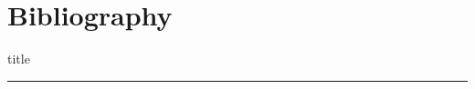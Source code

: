 \documentclass{beamer}
\begin{document}
\section{Bibliography}
    \begin{frame}[plain]
        \vfill
      \centering
      \begin{beamercolorbox}[sep=8pt,center,shadow=true,rounded=true]{title}
        \insertsectionhead\par%
        \color{oxfordblue}\noindent\rule{10cm}{1pt} \\
      \end{beamercolorbox}
      \vfill
  \end{frame}

\subsection{}
\begingroup
\newcommand\Fontvi{\fontsize{6}{7.2}\selectfont}
\Fontvi

\begin{frame}[plain]




\end{frame}
\end{document}
